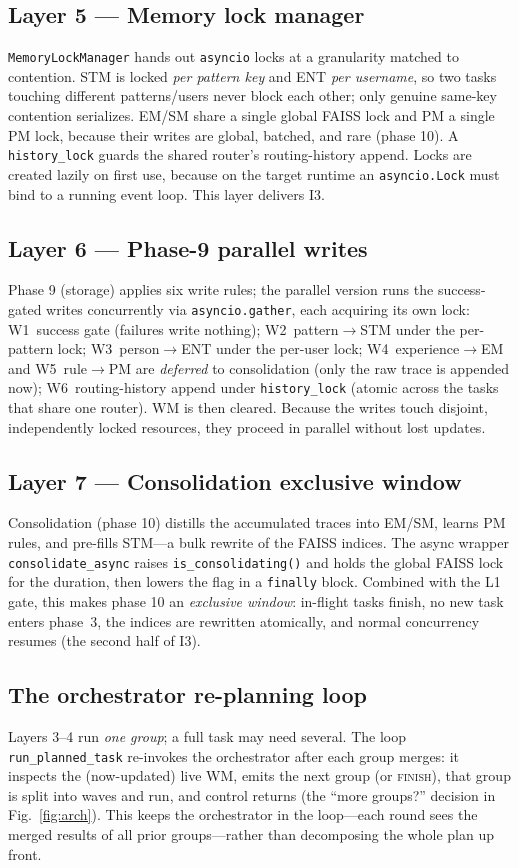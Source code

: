\documentclass[10pt,twocolumn]{article}
\newcommand{\code}[1]{\texttt{\small #1}}
\begin{document}
\subsection{Layer 5 --- Memory lock manager}
\code{MemoryLockManager} hands out \code{asyncio} locks at a granularity matched to
contention. STM is locked \emph{per pattern key} and ENT \emph{per username}, so
two tasks touching different patterns/users never block each other; only genuine
same-key contention serializes. EM/SM share a single global FAISS lock and PM a
single PM lock, because their writes are global, batched, and rare (phase 10). A
\code{history\_lock} guards the shared router's routing-history append. Locks are
created lazily on first use, because on the target runtime an \code{asyncio.Lock}
must bind to a running event loop. This layer delivers \textsc{I3}.

\subsection{Layer 6 --- Phase-9 parallel writes}
Phase 9 (storage) applies six write rules; the parallel version runs the
success-gated writes concurrently via \code{asyncio.gather}, each acquiring its own
lock: W1~success gate (failures write nothing); W2~pattern$\to$STM under the
per-pattern lock; W3~person$\to$ENT under the per-user lock; W4~experience$\to$EM
and W5~rule$\to$PM are \emph{deferred} to consolidation (only the raw trace is
appended now); W6~routing-history append under \code{history\_lock} (atomic across
the tasks that share one router). WM is then cleared. Because the writes touch
disjoint, independently locked resources, they proceed in parallel without lost
updates.

\subsection{Layer 7 --- Consolidation exclusive window}
Consolidation (phase 10) distills the accumulated traces into EM/SM, learns PM
rules, and pre-fills STM---a bulk rewrite of the FAISS indices. The async wrapper
\code{consolidate\_async} raises \code{is\_consolidating()} and holds the global
FAISS lock for the duration, then lowers the flag in a \code{finally} block.
Combined with the L1 gate, this makes phase 10 an \emph{exclusive window}:
in-flight tasks finish, no new task enters phase~3, the indices are rewritten
atomically, and normal concurrency resumes (the second half of \textsc{I3}).

\subsection{The orchestrator re-planning loop}
Layers 3--4 run \emph{one group}; a full task may need several. The loop
\code{run\_planned\_task} re-invokes the orchestrator after each group merges: it
inspects the (now-updated) live WM, emits the next group (or \textsc{finish}), that
group is split into waves and run, and control returns (the ``more groups?''
decision in Fig.~\ref{fig:arch}). This keeps the orchestrator in the loop---each
round sees the merged results of all prior groups---rather than decomposing the
whole plan up front.
\end{document}
